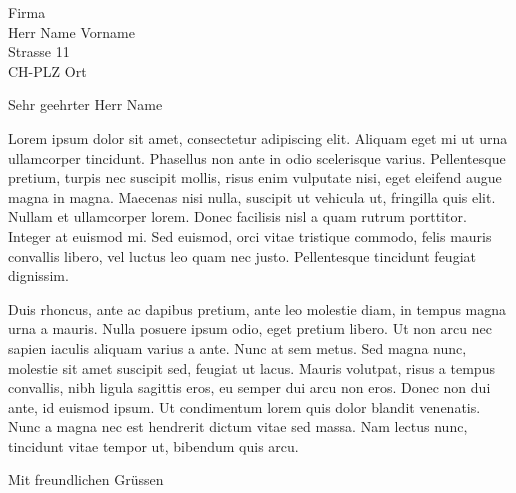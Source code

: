 \documentclass[SN, pagenumber=false, parskip=half, fromalign=left,
fromphone=true, fromemail=true, fromurl=false, fromlogo=false,
fromrule=false, draft=true]{scrlttr2}
\begin{document}
	\fontsize{10}{11.5}\selectfont

	\begin{letter}{Firma \\ Herr Name Vorname \\ Strasse 11  \\ CH-PLZ
	Ort}
	\opening{Sehr geehrter Herr Name}

	Lorem ipsum dolor sit amet, consectetur adipiscing elit. Aliquam eget mi ut urna ullamcorper tincidunt. Phasellus non ante in odio scelerisque varius. Pellentesque pretium, turpis nec suscipit mollis, risus enim vulputate nisi, eget eleifend augue magna in magna. Maecenas nisi nulla, suscipit ut vehicula ut, fringilla quis elit. Nullam et ullamcorper lorem. Donec facilisis nisl a quam rutrum porttitor. Integer at euismod mi. Sed euismod, orci vitae tristique commodo, felis mauris convallis libero, vel luctus leo quam nec justo. Pellentesque tincidunt feugiat dignissim.
 
	Duis rhoncus, ante ac dapibus pretium, ante leo molestie diam, in tempus magna urna a mauris. Nulla posuere ipsum odio, eget pretium libero. Ut non arcu nec sapien iaculis aliquam varius a ante. Nunc at sem metus. Sed magna nunc, molestie sit amet suscipit sed, feugiat ut lacus. Mauris volutpat, risus a tempus convallis, nibh ligula sagittis eros, eu semper dui arcu non eros. Donec non dui ante, id euismod ipsum. Ut condimentum lorem quis dolor blandit venenatis. Nunc a magna nec est hendrerit dictum vitae sed massa. Nam lectus nunc, tincidunt vitae tempor ut, bibendum quis arcu. 
  
	
	\closing{Mit freundlichen Grüssen}
	\end{letter}
\end{document}
